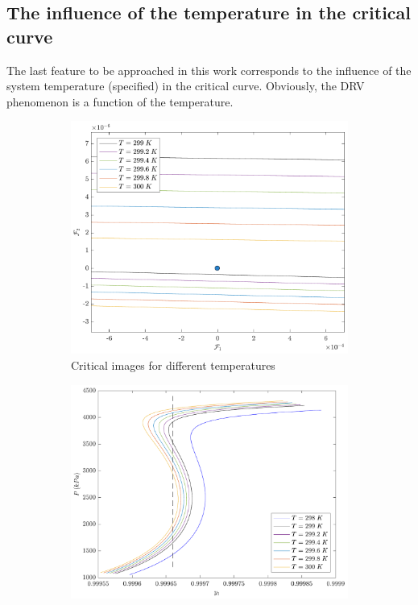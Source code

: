 \documentclass[journal=iecred,manuscript=article]{achemso}
\theoremstyle{definition}
\theoremstyle{remark}
\begin{document}
\subsection{The influence of the temperature in the critical curve}

The last feature to be approached in this work corresponds to the influence of the system temperature (specified) in the critical curve. Obviously, the DRV phenomenon is a function of the temperature.

\begin{figure}
\centering
\begin{subfigure}{.5\textwidth}
  \centering
  \includegraphics[width=0.95\columnwidth]{variacao_temperatura.pdf}
  \caption{Critical images for different temperatures}
  \label{fig:critical_images_temeprature_variation}
\end{subfigure}%
\begin{subfigure}{.5\textwidth}
  \centering
  \includegraphics[width=0.95\columnwidth]{variacao_temperatura_ponto_bolha.pdf}

\end{subfigure}
\end{figure}
\end{document}
